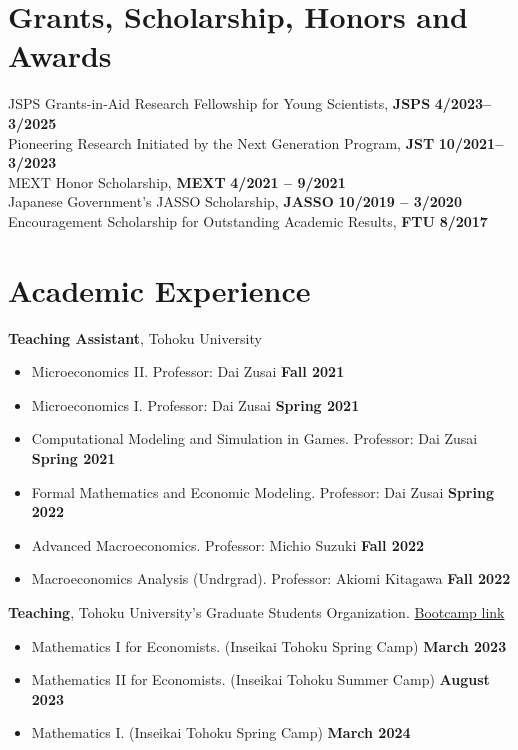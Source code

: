 \documentclass[margin,line]{res}
\begin{document}
\begin{resume}
\vspace{4mm}

\section{\sc Grants, Scholarship, Honors and Awards}
JSPS Grants-in-Aid Research Fellowship for Young Scientists, {\bf JSPS} \hfill {\bf 4/2023--3/2025}\\
Pioneering Research Initiated by the Next Generation Program, {\bf JST} \hfill {\bf 10/2021--3/2023}\\
MEXT Honor Scholarship, {\bf MEXT} \hfill {\bf 4/2021 -- 9/2021}\\
Japanese Government's JASSO Scholarship, {\bf JASSO} \hfill {\bf 10/2019 -- 3/2020}\\
Encouragement Scholarship for Outstanding Academic Results, {\bf FTU} \hfill {\bf 8/2017}\\

\vspace{4mm}

\section{\sc Academic Experience}
{\bf Teaching Assistant}, Tohoku University
\begin{itemize}
\item[ ] Microeconomics II. Professor: Dai Zusai \hfill {\bf Fall 2021}
\item[ ] Microeconomics I. Professor: Dai Zusai \hfill {\bf Spring 2021}
\item[ ] Computational Modeling and Simulation in Games. Professor: Dai Zusai \hfill {\bf Spring 2021}
\item[ ] Formal Mathematics and Economic Modeling. Professor: Dai Zusai \hfill {\bf Spring 2022}
\item[ ] Advanced Macroeconomics. Professor: Michio Suzuki \hfill {\bf Fall 2022}
\item[ ] Macroeconomics Analysis (Undrgrad). Professor: Akiomi Kitagawa \hfill {\bf Fall 2022}
\end{itemize}

{\bf Teaching}, Tohoku University's Graduate Students Organization. \href{https://thanhqtran.github.io/tohoku_bootcamp/}{Bootcamp link}
\begin{itemize}
\item[ ] Mathematics I for Economists. (Inseikai Tohoku Spring Camp) \hfill {\bf March 2023}
\item[ ] Mathematics II for Economists. (Inseikai Tohoku Summer Camp) \hfill {\bf August 2023}
\item[ ] Mathematics I. (Inseikai Tohoku Spring Camp) \hfill {\bf March 2024}
\end{itemize}


\end{resume}
\end{document}
